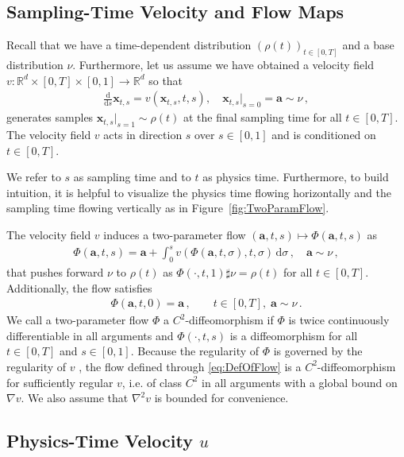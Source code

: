 \documentclass{article}
\newcommand{\bfx}{\boldsymbol{x}}
\newcommand{\bfa}{\boldsymbol{a}}
\theoremstyle{definition}
\theoremstyle{plain}
\theoremstyle{definition}
\theoremstyle{remark}
\newcommand{\Flow}{\Phi}
\begin{document}
\subsection{Sampling-Time Velocity and Flow Maps}\label{sec:subTwoParamFlow}

Recall that we have a time-dependent distribution $(\rho(t))_{t \in [0, T]}$ and a base distribution $\nu$. Furthermore, let us assume we have obtained a velocity field $v: \mathbb{R}^d \times [0, T] \times [0, 1] \to \mathbb{R}^d$  so that
\begin{align}\label{eq:FlowOfV}
\frac{\mathrm d}{\mathrm ds} \bfx_{t,s} = v(\bfx_{t,s}, t, s),\quad\bfx_{t,s} \big |_{s = 0} = \bfa \sim \nu\,,
\end{align}
generates samples $\bfx_{t,s} \big |_{s = 1} \sim \rho(t)$ at the final sampling time for all $t \in [0, T]$. The velocity field $v$ acts in direction $s$ over $s \in [0, 1]$ and is conditioned on $t \in [0, T]$.

We refer to $s$ as sampling time and to $t$ as physics time. Furthermore, to build intuition, it is helpful to visualize the physics time flowing horizontally and the sampling time flowing vertically as in Figure~\ref{fig:TwoParamFlow}.

The velocity field $v$ induces a two-parameter flow  $(\bfa, t, s) \mapsto \Flow(\bfa, t, s)$ as
\begin{align}\label{eq:DefOfFlow}
\Phi(\bfa, t, s) = \bfa + \int_0^s v(\Phi(\bfa, t, \sigma), t, \sigma) \, \mathrm d\sigma \, , \quad \bfa \sim \nu\,,
\end{align}
that pushes forward $\nu$ to $\rho(t)$ as $\Flow(\cdot, t, 1) \sharp \nu = \rho(t)$ for all $t \in [0, T]$. 
Additionally, the flow satisfies 
\begin{align}\label{eq:FlowCondS0}
\Flow(\bfa, t, 0) = \bfa\,,\qquad t \in [0, T], \; \bfa \sim \nu\,.
\end{align} 
We call a two-parameter flow $\Phi$ a $C^2$-diffeomorphism if $\Phi$ is twice continuously differentiable in all arguments and $\Phi(\cdot, t, s)$ is a diffeomorphism for all $t \in [0, T]$ and $s \in [0, 1]$. Because the regularity of $\Phi$ is governed by the regularity of $v$ \citep[Lemma 4.1.9]{abraham_manifolds_1988}, the flow defined through \eqref{eq:DefOfFlow} is a $C^2$-diffeomorphism for sufficiently regular $v$, i.e. of class $C^2$ in all arguments with a global bound on $\nabla v$. We also assume that $\nabla^2 v$ is bounded for convenience.

\subsection{Physics-Time Velocity $u$}\label{sec:RegularityV}
\end{document}

